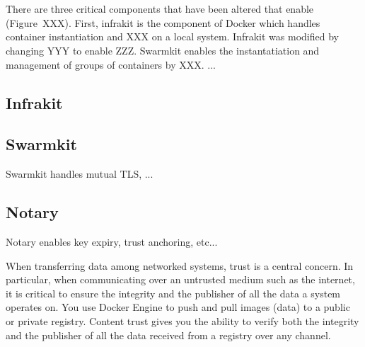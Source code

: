 \section{\sysname}
\label{SEC:architecture}


There are three critical components that have been altered that enable
\sysname (Figure~XXX).  First, infrakit is the component 
of Docker which handles container
instantiation and XXX on a local system.  Infrakit was modified by changing
YYY to enable ZZZ.   Swarmkit enables the instantatiation and management of 
groups of containers by XXX.  ...

\subsection{Infrakit}



\subsection{Swarmkit}
Swarmkit handles mutual TLS, ...


\subsection{Notary}
Notary enables key expiry, trust anchoring, etc...




When transferring data among networked systems, trust is a central concern.
In particular, when communicating over an untrusted medium such as the
internet, it is critical to ensure the integrity and the publisher of all
the data a system operates on. You use Docker Engine to push and pull
images (data) to a public or private registry. Content trust gives you the
ability to verify both the integrity and the publisher of all the data
received from a registry over any channel.

